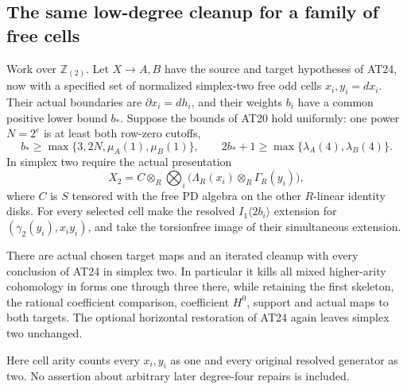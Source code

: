 \subsection{The same low-degree cleanup for a family of free cells}

\begin{corollary}
\label{AT25}
Work over $\mathbb Z_{(2)}$.
Let $X\to A,B$ have the source and target hypotheses
of AT24, now with a specified set of normalized
simplex-two free odd cells $x_i,y_i=dx_i$.
Their actual boundaries are $\partial x_i=dh_i$,
and their weights $b_i$ have a common positive lower
bound $b_*$. Suppose the bounds of AT20 hold uniformly:
one power $N=2^e$ is at least both row-zero cutoffs,
\[
 b_*\geq\max\{3,2N,\mu_A(1),\mu_B(1)\},\qquad
 2b_*+1\geq\max\{\lambda_A(4),\lambda_B(4)\}.
 \tag{AT.167}
\]
In simplex two require the actual presentation
\[
 X_2=C\otimes_R
       \bigotimes_i\bigl(\Lambda_R(x_i)\otimes_R\Gamma_R(y_i)\bigr),
 \tag{AT.168}
\]
where $C$ is $S$ tensored with the free PD algebra
on the other $R$-linear identity disks.
For every selected cell make the resolved
$I_1\langle2b_i\rangle$ extension for
$(\gamma_2(y_i),x_i y_i)$, and take the torsionfree
image of their simultaneous extension.

There are actual chosen target maps and an iterated
cleanup with every conclusion of AT24 in simplex two.
In particular it kills all mixed higher-arity
cohomology in forms one through three there, while
retaining the first skeleton, the rational coefficient
comparison, coefficient $H^0$, support and actual
maps to both targets.
The optional horizontal restoration of AT24 again
leaves simplex two unchanged.

Here cell arity counts every $x_i,y_i$ as one and
every original resolved generator as two.
No assertion about arbitrary later degree-four
repairs is included.
\end{corollary}

